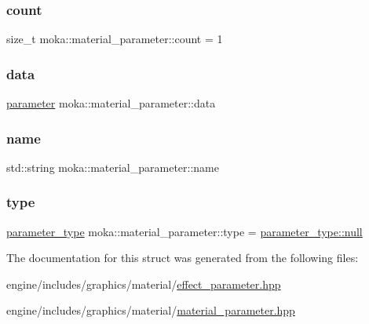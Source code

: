 \subsubsection{\texorpdfstring{count}{count}}
{\footnotesize\ttfamily size\+\_\+t moka\+::material\+\_\+parameter\+::count = 1}

\mbox{\label{structmoka_1_1material__parameter_a13f49bc49ae262cc75f8717869f769eb}} 
\subsubsection{\texorpdfstring{data}{data}}
{\footnotesize\ttfamily \mbox{\hyperlink{namespacemoka_afdb5f6e8afb209971d12dec045ec48ee}{parameter}} moka\+::material\+\_\+parameter\+::data}

\mbox{\label{structmoka_1_1material__parameter_a9bac68a3935142d56b14332f33b71dc2}} 
\subsubsection{\texorpdfstring{name}{name}}
{\footnotesize\ttfamily std\+::string moka\+::material\+\_\+parameter\+::name}

\mbox{\label{structmoka_1_1material__parameter_a4a9035370e7b6c97cf89275c712cbd9e}} 
\subsubsection{\texorpdfstring{type}{type}}
{\footnotesize\ttfamily \mbox{\hyperlink{namespacemoka_aed2224bc0e5b79e57a8975ded94ee1aa}{parameter\+\_\+type}} moka\+::material\+\_\+parameter\+::type = \mbox{\hyperlink{namespacemoka_a6d27be7986842909ecfb039004d3f9e9a37a6259cc0c1dae299a7866489dff0bd}{parameter\+\_\+type\+::null}}}



The documentation for this struct was generated from the following files\+:\begin{DoxyCompactItemize}
\item 
engine/includes/graphics/material/\mbox{\hyperlink{effect__parameter_8hpp}{effect\+\_\+parameter.\+hpp}}\item 
engine/includes/graphics/material/\mbox{\hyperlink{material__parameter_8hpp}{material\+\_\+parameter.\+hpp}}\end{DoxyCompactItemize}
